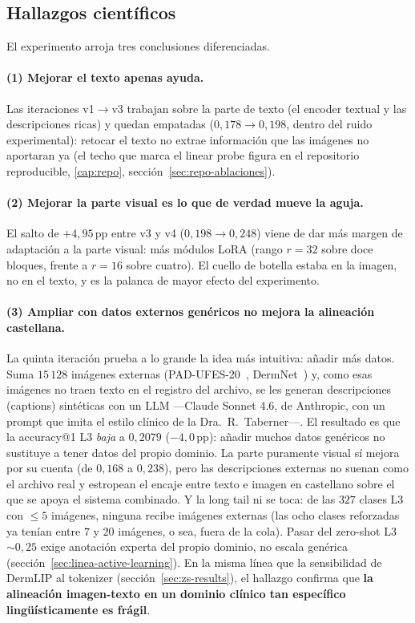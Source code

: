 \subsection{Hallazgos científicos}
\label{sec:spanderm-escala-especificidad}

El experimento arroja tres conclusiones diferenciadas.

\paragraph{(1) Mejorar el texto apenas ayuda.}
Las iteraciones v1$\to$v3 trabajan sobre la parte de texto (el encoder
textual y las descripciones ricas) y quedan empatadas
($0{,}178 \to 0{,}198$, dentro del ruido experimental): retocar el texto
no extrae información que las imágenes no aportaran ya (el techo que marca
el linear probe figura en el repositorio reproducible,
\ref{cap:repo}, sección~\ref{sec:repo-ablaciones}).

\paragraph{(2) Mejorar la parte visual es lo que de verdad mueve la
aguja.} El salto de $+4{,}95$\,pp entre v3 y v4 ($0{,}198 \to 0{,}248$)
viene de dar más margen de adaptación a la parte visual: más módulos LoRA
(rango $r=32$ sobre doce bloques, frente a $r=16$ sobre cuatro). El cuello
de botella estaba en la imagen, no en el texto, y es la palanca de mayor
efecto del experimento.

\paragraph{(3) Ampliar con datos externos genéricos no mejora la
alineación castellana.} La quinta iteración prueba a lo grande la idea
más intuitiva: añadir más datos. Suma $15\,128$ imágenes externas
(PAD-UFES-20~\cite{padufes}, DermNet~\cite{dermnet}) y, como esas
imágenes no traen texto en el registro del archivo, se les generan
descripciones (captions) sintéticas con un LLM ---Claude Sonnet 4.6, de
Anthropic, con un prompt que imita el estilo clínico de la
Dra.~R.~Taberner---. El resultado es que la accuracy@1 L3 \emph{baja} a
$0{,}2079$ ($-4{,}0$\,pp): añadir muchos datos genéricos no sustituye a
tener datos del propio dominio. La parte puramente visual sí mejora por
su cuenta (de $0{,}168$ a $0{,}238$), pero las descripciones externas no
suenan como el archivo real y estropean el encaje entre texto e imagen en
castellano sobre el que se apoya el sistema combinado. Y la long tail ni se toca: de las $327$
clases L3 con $\leq 5$ imágenes, ninguna recibe imágenes externas (las
ocho clases reforzadas ya tenían entre $7$ y $20$ imágenes, o sea,
fuera de la cola).
Pasar del zero-shot L3 $\sim 0{,}25$ exige anotación experta del propio
dominio, no escala genérica (sección~\ref{sec:linea-active-learning}).
En la misma línea que la sensibilidad de DermLIP al tokenizer
(sección~\ref{sec:zs-results}), el hallazgo confirma que \textbf{la
alineación imagen-texto en un dominio clínico tan específico
lingüísticamente es frágil}.

